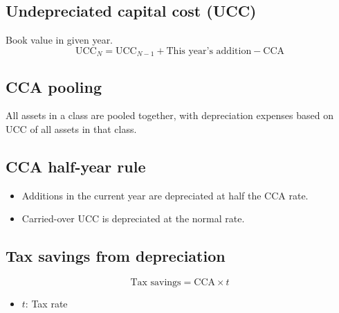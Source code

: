 \subsection{Undepreciated capital cost (UCC)}
\begin{definition}
    Book value in given year.
    \begin{equation}
        \text{UCC}_N = \text{UCC}_{N-1} + \text{This year's addition} - \text{CCA}
    \end{equation}
\end{definition}

\subsection{CCA pooling}
\begin{definition}
    All assets in a class are pooled together, with depreciation expenses based on UCC of all assets in that class.
\end{definition}

\subsection{CCA half-year rule}
\begin{definition}
    \begin{itemize}
        \item Additions in the current year are depreciated at half the CCA rate. 
        \item Carried-over UCC is depreciated at the normal rate.
    \end{itemize}
\end{definition}

\subsection{Tax savings from depreciation}
\begin{definition}
    \begin{equation}
        \text{Tax savings} = \text{CCA} \times t 
    \end{equation}
    \begin{itemize}
        \item $t$: Tax rate
    \end{itemize}
\end{definition}

